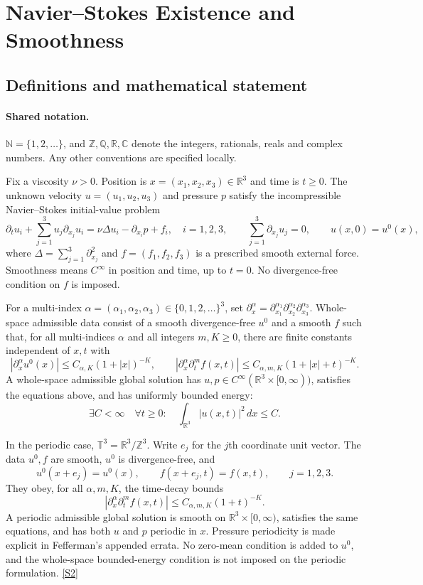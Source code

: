 \documentclass[11pt]{article}
\newcommand{\sref}[2]{\hyperlink{source:#1:#2}{[S#2]}}
\begin{document}
\section{Navier–Stokes Existence and Smoothness}\label{statement}

\subsection{Definitions and mathematical statement}

\paragraph{Shared notation.}$\mathbb N=\{1,2,\ldots\}$, and $\mathbb Z,\mathbb Q,\mathbb R,\mathbb C$ denote the integers, rationals, reals and complex numbers. Any other conventions are specified locally.


Fix a viscosity $\nu>0$. Position is $x=(x_1,x_2,x_3)\in\mathbb R^3$ and time is $t\ge0$. The unknown velocity $u=(u_1,u_2,u_3)$ and pressure $p$ satisfy the incompressible Navier--Stokes initial-value problem
\[
 \partial_t u_i+\sum_{j=1}^3u_j\partial_{x_j}u_i
 =\nu\Delta u_i-\partial_{x_i}p+f_i,
 \quad i=1,2,3,\qquad
 \sum_{j=1}^3\partial_{x_j}u_j=0,\qquad u(x,0)=u^0(x),
\]
where $\Delta=\sum_{j=1}^3\partial_{x_j}^2$ and $f=(f_1,f_2,f_3)$ is a prescribed smooth external force. Smoothness means $C^\infty$ in position and time, up to $t=0$. No divergence-free condition on $f$ is imposed.

For a multi-index $\alpha=(\alpha_1,\alpha_2,\alpha_3)\in\{0,1,2,\ldots\}^3$, set $\partial_x^\alpha=\partial_{x_1}^{\alpha_1}\partial_{x_2}^{\alpha_2}\partial_{x_3}^{\alpha_3}$. Whole-space admissible data consist of a smooth divergence-free $u^0$ and a smooth $f$ such that, for all multi-indices $\alpha$ and all integers $m,K\ge0$, there are finite constants independent of $x,t$ with
\[
 |\partial_x^\alpha u^0(x)|\le C_{\alpha,K}(1+|x|)^{-K},\qquad
 |\partial_x^\alpha\partial_t^m f(x,t)|\le C_{\alpha,m,K}(1+|x|+t)^{-K}.
\]
A whole-space admissible global solution has $u,p\in C^\infty(\mathbb R^3\times[0,\infty))$, satisfies the equations above, and has uniformly bounded energy:
\[
 \exists C<\infty\quad\forall t\ge0:\quad
 \int_{\mathbb R^3}|u(x,t)|^2\,dx\le C.
\]

In the periodic case, $\mathbb T^3=\mathbb R^3/\mathbb Z^3$. Write $e_j$ for the $j$th coordinate unit vector. The data $u^0,f$ are smooth, $u^0$ is divergence-free, and
\[
 u^0(x+e_j)=u^0(x),\qquad f(x+e_j,t)=f(x,t),\qquad j=1,2,3.
\]
They obey, for all $\alpha,m,K$, the time-decay bounds
\[
 |\partial_x^\alpha\partial_t^m f(x,t)|
 \le C_{\alpha,m,K}(1+t)^{-K}.
\]
A periodic admissible global solution is smooth on $\mathbb R^3\times[0,\infty)$, satisfies the same equations, and has both $u$ and $p$ periodic in $x$. Pressure periodicity is made explicit in Fefferman's appended errata. No zero-mean condition is added to $u^0$, and the whole-space bounded-energy condition is not imposed on the periodic formulation. \sref{statement}{2}
\end{document}

